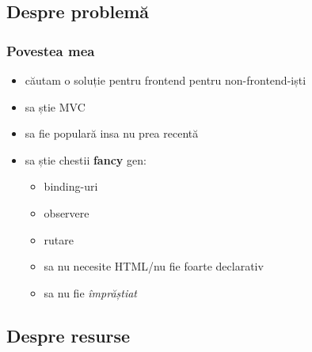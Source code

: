\documentclass[compress]{beamer}
\begin{document}
\subsection{Despre problemă}

\begin{frame}
\frametitle{Povestea mea}

\hypertarget{why}{}

\begin{itemize}[<+->]
  \item căutam o soluție pentru frontend pentru non-frontend-iști
  \item sa știe MVC
  \item sa fie populară insa nu prea recentă
  \item sa știe chestii \textbf{fancy} gen:
    \begin{itemize}[<+->]
      \item binding-uri
      \item observere
      \item rutare
      \item sa nu necesite HTML/nu fie foarte declarativ
      \item sa nu fie \em împrăștiat
    \end{itemize}
\end{itemize}
\end{frame}

\subsection{Despre resurse}
\end{document}
